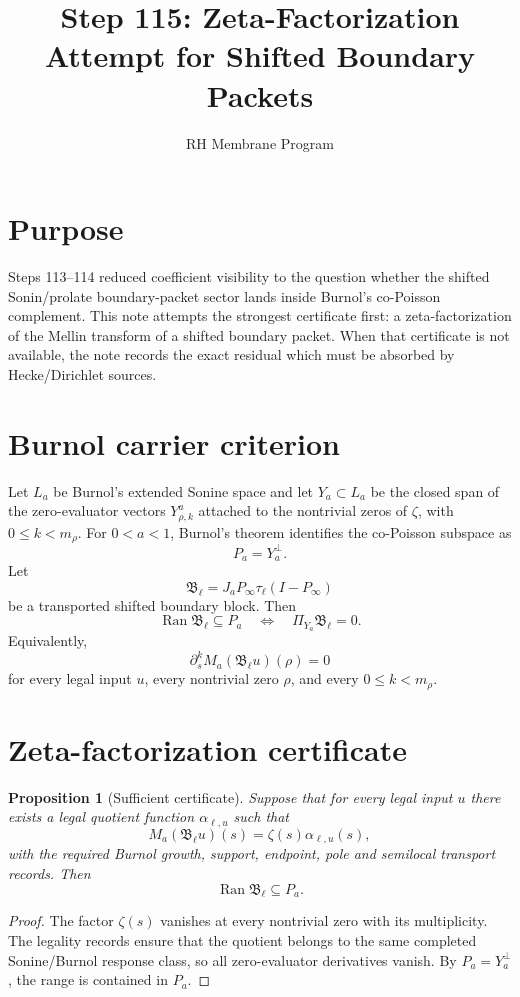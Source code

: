 \documentclass[11pt]{article}
\title{Step 115: Zeta-Factorization Attempt for Shifted Boundary Packets}
\author{RH Membrane Program}
\date{}
\newtheorem{proposition}{Proposition}
\begin{document}
\maketitle

\section{Purpose}
Steps 113--114 reduced coefficient visibility to the question whether the shifted Sonin/prolate boundary-packet sector lands inside Burnol's co-Poisson complement.  This note attempts the strongest certificate first: a zeta-factorization of the Mellin transform of a shifted boundary packet.  When that certificate is not available, the note records the exact residual which must be absorbed by Hecke/Dirichlet sources.

\section{Burnol carrier criterion}
Let $L_a$ be Burnol's extended Sonine space and let $Y_a\subset L_a$ be the closed span of the zero-evaluator vectors $Y^a_{\rho,k}$ attached to the nontrivial zeros of $\zeta$, with $0\le k<m_\rho$.  For $0<a<1$, Burnol's theorem identifies the co-Poisson subspace as
\[
P_a=Y_a^\perp.
\]
Let
\[
\mathfrak B_\ell=J_aP_\infty\tau_\ell(I-P_\infty)
\]
be a transported shifted boundary block.  Then
\[
\operatorname{Ran}\mathfrak B_\ell\subseteq P_a
\quad\Longleftrightarrow\quad
\Pi_{Y_a}\mathfrak B_\ell=0.
\]
Equivalently,
\[
\partial_s^k M_a(\mathfrak B_\ell u)(\rho)=0
\]
for every legal input $u$, every nontrivial zero $\rho$, and every $0\le k<m_\rho$.

\section{Zeta-factorization certificate}
\begin{proposition}[Sufficient certificate]
Suppose that for every legal input $u$ there exists a legal quotient function $\alpha_{\ell,u}$ such that
\[
M_a(\mathfrak B_\ell u)(s)=\zeta(s)\alpha_{\ell,u}(s),
\]
with the required Burnol growth, support, endpoint, pole and semilocal transport records.  Then
\[
\operatorname{Ran}\mathfrak B_\ell\subseteq P_a.
\]
\end{proposition}
\begin{proof}
The factor $\zeta(s)$ vanishes at every nontrivial zero with its multiplicity.  The legality records ensure that the quotient belongs to the same completed Sonine/Burnol response class, so all zero-evaluator derivatives vanish.  By $P_a=Y_a^\perp$, the range is contained in $P_a$.
\end{proof}
\end{document}

